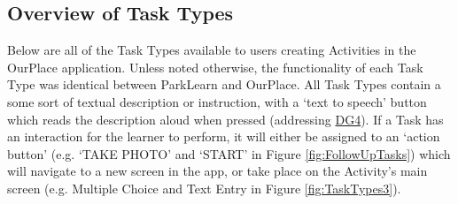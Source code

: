 \subsection{Overview of Task Types}
\label{sec:TaskTypes}
Below are all of the Task Types available to users creating Activities in the OurPlace application. Unless noted otherwise, the functionality of each Task Type was identical between ParkLearn and OurPlace. All Task Types contain a some sort of textual description or instruction, with a `text to speech' button which reads the description aloud when pressed (addressing \hyperref[DG4]{DG4}). If a Task has an interaction for the learner to perform, it will either be assigned to an `action button' (e.g. `TAKE PHOTO' and `START' in Figure \ref{fig:FollowUpTasks}) which will navigate to a new screen in the app, or take place on the Activity's main screen (e.g. Multiple Choice and Text Entry in Figure \ref{fig:TaskTypes3}). 

